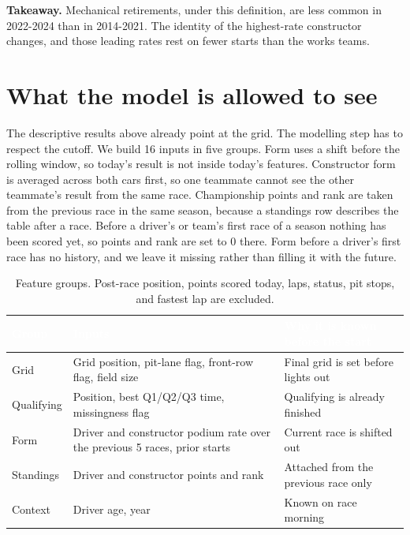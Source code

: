\documentclass[10pt,a4paper]{article}
\begin{document}
\begin{takeaway}
\textbf{Takeaway.} Mechanical retirements, under this definition, are less common in 2022-2024 than in 2014-2021. The identity of the highest-rate constructor changes, and those leading rates rest on fewer starts than the works teams.
\end{takeaway}



\section{What the model is allowed to see}


The descriptive results above already point at the grid. The modelling step has to respect the cutoff. We build 16 inputs in five groups. Form uses a shift before the rolling window, so today's result is not inside today's features. Constructor form is averaged across both cars first, so one teammate cannot see the other teammate's result from the same race. Championship points and rank are taken from the previous race in the same season, because a standings row describes the table after a race. Before a driver's or team's first race of a season nothing has been scored yet, so points and rank are set to 0 there. Form before a driver's first race has no history, and we leave it missing rather than filling it with the future.


\begin{table}[H]
\centering
\caption{Feature groups. Post-race position, points scored today, laps, status, pit stops, and fastest lap are excluded.}
{\small{}
\begin{tabular}{>{\raggedright\arraybackslash}p{}>{\raggedright\arraybackslash}p{}>{\raggedright\arraybackslash}p{}}
\toprule
\rowcolor{navy}
\textcolor{white}{\textbf{Group}} & \textcolor{white}{\textbf{Inputs}} & \textcolor{white}{\textbf{Why it is known before the start}} \\
\midrule
Grid & Grid position, pit-lane flag, front-row flag, field size & Final grid is set before lights out \\
Qualifying & Position, best Q1/Q2/Q3 time, missingness flag & Qualifying is already finished \\
Form & Driver and constructor podium rate over the previous 5 races, prior starts & Current race is shifted out \\
Standings & Driver and constructor points and rank & Attached from the previous race only \\
Context & Driver age, year & Known on race morning \\
\bottomrule
\end{tabular}}
\end{table}
\end{document}

